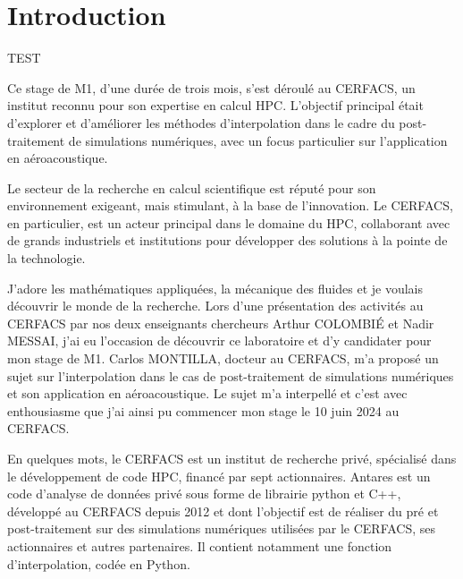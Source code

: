 \section*{Introduction}

TEST

Ce stage de M1, d'une durée de trois mois, s'est déroulé au CERFACS, un institut reconnu pour son expertise en calcul \ac{HPC}. L'objectif principal était d'explorer et d'améliorer les méthodes d'interpolation dans le cadre du post-traitement de simulations numériques, avec un focus particulier sur l'application en aéroacoustique.

Le secteur de la recherche en calcul scientifique est réputé pour son environnement exigeant, mais stimulant, à la base de l'innovation. Le CERFACS, en particulier, est un acteur principal dans le domaine du HPC, collaborant avec de grands industriels et institutions pour développer des solutions à la pointe de la technologie.





J'adore les mathématiques appliquées, la mécanique des fluides et je voulais découvrir le monde de la recherche. Lors d'une présentation des activités au \ac{CERFACS} par nos deux enseignants chercheurs Arthur COLOMBIÉ et Nadir MESSAI, j'ai eu l'occasion de découvrir ce laboratoire et d'y candidater pour mon stage de M1. Carlos MONTILLA, docteur au CERFACS, m'a proposé un sujet sur l'interpolation dans le cas de post-traitement de simulations numériques et son application en aéroacoustique. Le sujet m'a interpellé et c'est avec enthousiasme que j'ai ainsi pu commencer mon stage le 10 juin 2024 au CERFACS.

En quelques mots, le CERFACS est un institut de recherche privé, spécialisé dans le développement de code HPC, financé par sept actionnaires. %
Antares \cite{antares} est un code d’analyse de données privé sous forme de librairie python et C++, développé au CERFACS depuis 2012 et dont l'objectif est de réaliser du pré et post-traitement sur des simulations numériques utilisées par le CERFACS, ses actionnaires et autres partenaires.
Il contient notamment une fonction d'interpolation, codée en Python.

